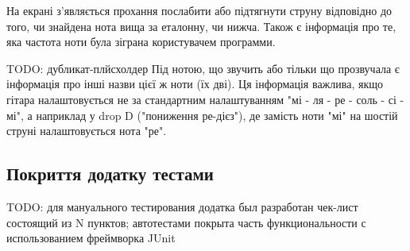 На екрані з'являється прохання послабити або підтягнути струну відповідно до того, чи знайдена нота вища за еталонну, чи нижча. Також є інформація про те, яка частота ноти була зіграна користувачем программи.

TODO: дубликат-плйсхолдер Під нотою, що звучить або тільки що прозвучала є інформація про інші назви цієї ж ноти (їх дві). Ця інформація важлива, якщо гітара налаштовується не за стандартним налаштуванням "мі - ля - ре - соль - сі - мі", а наприклад у drop D ("пониження ре-дієз"), де замість ноти "мі" на шостій струні налаштовується нота "ре".

\subsection{Покриття додатку тестами}

TODO: для мануального тестирования додатка был разработан чек-лист состоящий из N пунктов;
автотестами покрыта часть функциональности с использованием фреймворка JUnit